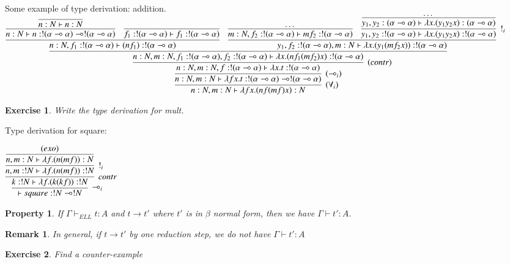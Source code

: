 \documentclass[a4paper,10pt]{article}
\newcommand{\limpl}{\multimap}  %
\newtheorem{prop}{Property}
\newtheorem{exo}{Exercise}
\newtheorem{rmk}{Remark}
\begin{document}
\par Some example of type derivation: addition.\\
\vspace{0.3cm}
\hspace{-2.5cm}
$ \infer[(\forall_i)]{n:N, m:N \vdash \lambda f x.(n f (m f) x) : N}
	{
	\infer[(\limpl_i)]{n:N , m:N \vdash \lambda f x. t : !(\alpha \limpl \alpha) \limpl !(\alpha \limpl \alpha)}
	{
	\infer[(contr)]{n:N , m:N, f:!(\alpha \limpl \alpha) \vdash \lambda x.t : !(\alpha \limpl \alpha)}
		{
			\infer{n:N , m:N, f_1:!(\alpha \limpl \alpha), f_2:!(\alpha \limpl \alpha) \vdash \lambda x. (n f_1 (m f_2) x) : !(\alpha \limpl \alpha)}
			{
			\infer{n:N, f_1:!(\alpha \limpl \alpha) \vdash (n f_1):!(\alpha \limpl \alpha)}
				{
				\infer{n:N \vdash n:!(\alpha \limpl \alpha) \limpl !(\alpha \limpl \alpha)}{\infer{n:N \vdash n:N}{}}
				&
				\infer{f_1:!(\alpha \limpl \alpha) \vdash f_1:!(\alpha \limpl \alpha)}{}
				}
			&
			\infer{y_1,f_2:!(\alpha \limpl \alpha), m:N \vdash \lambda x.(y_1 (m f_2 x)): !(\alpha \limpl \alpha)}
				{
				\infer{m:N, f_2:!(\alpha\limpl\alpha) \vdash m f_2 : !(\alpha \limpl \alpha)}{ \dots }
				&
				\infer[!_i]{y_1, y_2:!(\alpha \limpl \alpha) \vdash \lambda x. (y_1 y_2 x):!(\alpha \limpl \alpha)}
					{
					\infer{y_1, y_2:(\alpha \limpl \alpha) \vdash \lambda x. (y_1 y_2 x):(\alpha \limpl \alpha)}{ \dots } 
					}
				}
			}
		}
	}
	}$

\begin{exo}
Write the type derivation for mult.
\end{exo}

\par Type derivation for square:
\begin{center}
$	\infer[\limpl_i]{\vdash square: !N \limpl !N}{
		\infer[contr]{k:!N \vdash \lambda f.(k (k f)): !N}{
			\infer[!_i]{n,m:!N \vdash \lambda f.(n (m f)): !N}{
				\infer{n,m:N \vdash \lambda f.(n (m f)): N}{ (exo) }
			}
		}
	}$
\end{center}

\begin{prop}
If $\Gamma \vdash_{ELL} t:A$ and $t \rightarrow t'$ where $t'$ is in $\beta$ normal form, then we have $\Gamma \vdash t':A$.
\end{prop}

\begin{rmk}
In general, if $t \rightarrow t'$ by one reduction step, we do not have $\Gamma \vdash t':A$
\end{rmk}

\begin{exo}
Find a counter-example
\end{exo}
\end{document}
